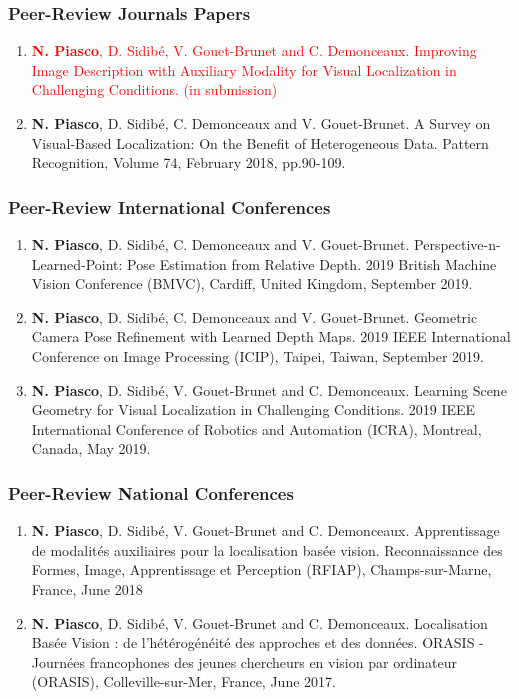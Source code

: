 \begin{publication}

\subsubsection*{Peer-Review Journals Papers}

\begin{enumerate}\scriptsize
	\item \textcolor{red}{\textbf{N. Piasco}, D. Sidib\'e, V. Gouet-Brunet and C. Demonceaux. Improving Image Description with Auxiliary Modality for Visual Localization in Challenging Conditions. (in submission)}
	\item \textbf{N. Piasco}, D. Sidib\'e, C. Demonceaux and V. Gouet-Brunet. A Survey on Visual-Based Localization: On the Benefit of Heterogeneous Data. Pattern Recognition, Volume 74, February 2018, pp.90-109.
\end{enumerate}

\subsubsection*{Peer-Review International Conferences}

\begin{enumerate}\scriptsize
	\item \textbf{N. Piasco}, D. Sidib\'e, C. Demonceaux and V. Gouet-Brunet. Perspective-n-Learned-Point: Pose Estimation from Relative Depth. 2019 British Machine Vision Conference (BMVC), Cardiff, United Kingdom, September 2019.
	\item \textbf{N. Piasco}, D. Sidib\'e, C. Demonceaux and V. Gouet-Brunet. Geometric Camera Pose Refinement with Learned Depth Maps. 2019 IEEE International Conference on Image Processing (ICIP), Taipei, Taiwan, September 2019.
	\item \textbf{N. Piasco}, D. Sidib\'e, V. Gouet-Brunet and C. Demonceaux. Learning Scene Geometry for Visual Localization in Challenging Conditions. 2019 IEEE International Conference of Robotics and Automation (ICRA), Montreal, Canada, May 2019.	
\end{enumerate}

\subsubsection*{Peer-Review National Conferences}

\begin{enumerate}\scriptsize
	\item \textbf{N. Piasco}, D. Sidib\'e, V. Gouet-Brunet and C. Demonceaux. Apprentissage de modalit\'es auxiliaires pour la localisation bas\'ee vision. Reconnaissance des Formes, Image, Apprentissage et Perception (RFIAP), Champs-sur-Marne, France, June 2018
	\item \textbf{N. Piasco}, D. Sidib\'e, V. Gouet-Brunet and C. Demonceaux. Localisation Bas\'ee Vision : de l’h\'et\'erog\'en\'eit\'e des approches et des données. ORASIS - Journ\'ees francophones des jeunes chercheurs en vision par ordinateur (ORASIS), Colleville-sur-Mer, France, June 2017.
\end{enumerate}


\end{publication}
